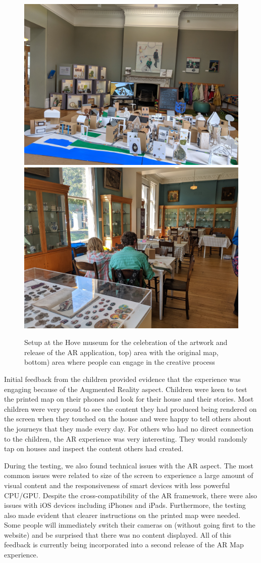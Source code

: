 \documentclass[acmlarge,screen,dvipsnames]{acmart}
\begin{document}
\begin{figure}[ht] \centering
\includegraphics[width=0.6\linewidth]{images/IMG_20190720_103105.jpg}
\includegraphics[width=0.6\linewidth]{images/IMG_20190720_151644.jpg}
\caption{Setup at the Hove museum for the celebration of the artwork and
release of the AR application, top) area with the original map, bottom) area
where people can engage in the creative process} \label{fig:museum}
\end{figure}
 
Initial feedback from the children provided evidence that the experience was
engaging because of the Augmented Reality aspect. Children were keen to test
the printed map on their phones and look for their house and their stories.
Most children were very proud to see the content they had produced being
rendered on the screen when they touched on the house and were happy to tell
others about the journeys that they made every day. For others who had no
direct connection to the children, the AR experience was very interesting.
They would randomly tap on houses and inspect the content others had created.
 
 During the testing, we also found technical issues with the AR aspect. The
 most common issues were related to size of the screen to experience a large
 amount of visual content and the responsiveness of smart devices with less
 powerful CPU/GPU. Despite the cross-compatibility of the AR framework, there
 were also issues with iOS devices including iPhones and iPads. Furthermore,
 the testing also made evident that clearer instructions on the printed map
 were needed. Some people will immediately switch their cameras on (without
 going first to the website) and be surprised that there was no content
 displayed.  All of this feedback is currently being incorporated into a
 second release of the AR Map experience. 
\end{document}
